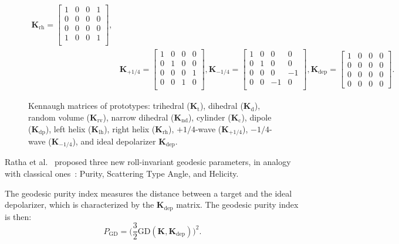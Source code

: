 \documentclass[journal]{IEEEtran}
\begin{document}
\begin{figure}
\[\begin{split}
%
\bm K_{\text{rh}}=
\begin{bmatrix}
1 & 0 & 0 & 1\\
0 & 0 & 0 & 0\\
0 & 0 & 0 & 0\\
1 & 0 & 0 & 1\\
\end{bmatrix},\\
%
&\bm K_{+1/4}=
\begin{bmatrix}
1 & 0 & 0 & 0\\
0 & 1 & 0 & 0\\
0 & 0 & 0 & 1\\
0 & 0 & 1 & 0\\
\end{bmatrix},
%
\bm K_{-1/4}=
\begin{bmatrix}
1 & 0 & 0 & 0\\
0 & 1 & 0 & 0\\
0 & 0 & 0 & -1\\
0 & 0 & -1 & 0\\
\end{bmatrix},
%
\bm{K}_{\text{dep}} =
\begin{bmatrix}
1 & 0 & 0 & 0\\
0 & 0 & 0 & 0\\
0 & 0 & 0 & 0\\
0 & 0 & 0 & 0
\end{bmatrix}.
\end{split}
\]
\caption{Kennaugh matrices of prototypes: {trihedral} ($\bm K_\text{t}$), 
	{dihedral} ($\bm K_{\text{d}}$), 
	{random volume} ($\bm K_{\text{rv}}$), 
	{narrow dihedral} ($\bm K_{\text{nd}}$), 
	{cylinder}  ($\bm K_{\text{c}}$), 
	{dipole}  ($\bm K_{\text{dp}}$), 
	{left helix} ($\bm K_{\text{lh}}$), 
	{right helix} ($\bm K_{\text{rh}}$), 
	{$+1/4$-wave} ($\bm K_{+1/4}$), 
 {$-1/4$-wave} ($\bm K_{-1/4}$), and ideal depolarizer $\bm K_{\text{dep}}$.}
\label{fig:ElementaryK}
\end{figure}

Ratha et al.~\cite{APolSARScatteringPowerFactorizationFrameworkandNovelRollInvariantParametersBasedUnsupervisedClassificationSchemeUsingaGeodesicDistanceinpress} proposed three new roll-invariant geodesic parameters, in analogy with classical ones~\cite{CloudePottier:97}: Purity, Scattering Type Angle, and Helicity.

The geodesic purity index measures the distance between a target and the ideal depolarizer, which is characterized by the $\bm{K}_{\text{dep}}$ matrix.
The geodesic purity index is then:
\begin{equation}
P_{\text{GD}} = \Big(\frac{3}{2}\text{GD}(\bm{K}, \bm{K}_{\text{dep}})\Big)^2.
\end{equation}
\end{document}
